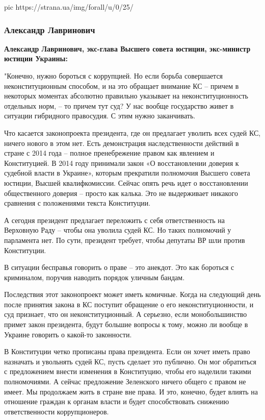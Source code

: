 \ifcmt
pic https://strana.ua/img/forall/u/0/25/%
\fi

\subsubsection{Александр Лавринович}

{\bfseries 
Александр Лавринович, экс-глава Высшего совета юстиции, экс-министр юстиции Украины:
}

"Конечно, нужно бороться с коррупцией. Но если борьба совершается
неконституционным способом, и на это обращает внимание КС – причем в некоторых
моментах абсолютно правильно указывает на неконституционность отдельных норм, –
то причем тут суд? У нас вообще государство живет в ситуации гибридного
правосудия. С этим нужно заканчивать.

Что касается законопроекта президента, где он предлагает уволить всех судей КС,
ничего нового в этом нет. Есть демонстрация наследственности действий в стране
с 2014 года – полное пренебрежение правом как явлением и Конституцией. В 2014
году принимали закон «О восстановлении доверия к судебной власти в Украине»,
которым прекратили полномочия Высшего совета юстиции, Высшей квалифкомиссии.
Сейчас опять речь идет о восстановлении общественного доверия – просто как
калька. Это не выдерживает никакого сравнения с положениями текста Конституции.

А сегодня президент предлагает переложить с себя ответственность на Верховную
Раду – чтобы она уволила судей КС. Но таких полномочий у парламента нет. По
сути, президент требует, чтобы депутаты ВР шли против Конституции.

В ситуации бесправья говорить о праве – это анекдот.  Это как бороться с
криминалом, поручив наводить порядок уличным бандам.

Последствия этот законопроект может иметь комичные. Когда на следующий день
после принятия закона в КС поступит обращение о его неконституционности, и суд
признает, что он неконституционный. А серьезно, если монобольшинство примет
закон президента, будут большие вопросы к тому, можно ли вообще в Украине
говорить о какой-то законности.

В Конституции четко прописаны права президента. Если он хочет иметь право
назначать и увольнять судей КС, пусть сделает это публично. Он мог обратиться с
предложением внести изменения в Конституцию, чтобы его наделили такими
полномочиями. А сейчас  предложение Зеленского ничего общего с правом не имеет.
Мы продолжаем жить в стране вне права. И это, конечно, будет влиять на
отношение граждан к органам власти и будет способствовать снижению
ответственности коррупционеров.

